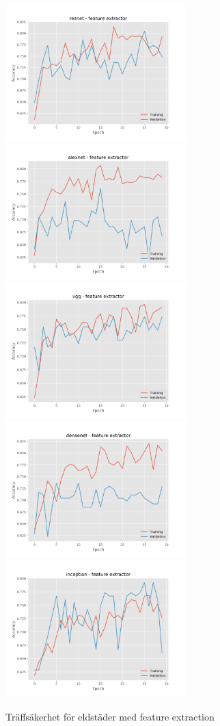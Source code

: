 \documentclass[]{kththesis}
\begin{document}
  \begin{figure}[h]
    \includegraphics[width=7cm]{f_a_resnet_fe}
    \includegraphics[width=7cm]{f_a_alexnet_fe}
    \includegraphics[width=7cm]{f_a_vgg_fe}
    \includegraphics[width=7cm]{f_a_densenet_fe}
    \includegraphics[width=7cm]{f_a_inception_fe}
    \caption{Träffsäkerhet för eldstäder med feature extraction}
    \label{fig:f_a_1}
  \end{figure}
\end{document}
